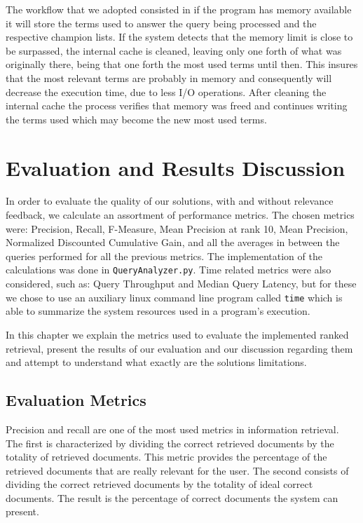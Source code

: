 \documentclass[12pt]{article}
\begin{document}
The workflow that we adopted consisted in if the program has memory available it will store the terms used to answer the query being processed and the respective champion lists. If the system detects that the memory limit is close to be surpassed, the internal cache is cleaned, leaving only one forth of what was originally there, being that one forth the most used terms until then. This insures that the most relevant terms are probably in memory and consequently will decrease the execution time, due to less I/O operations.  After cleaning the internal cache the process verifies that memory was freed and continues writing the terms used which may become the new most used terms.

\section{Evaluation and Results Discussion}

In order to evaluate the quality of our solutions, with and without relevance 
feedback, we calculate an assortment of performance metrics.
The chosen metrics were: Precision, Recall, F-Measure, Mean Precision at rank 10, 
Mean Precision, Normalized Discounted Cumulative Gain, and all the averages in 
between the queries performed for all the previous metrics.
The implementation of the calculations was done in \texttt{QueryAnalyzer.py}.
Time related metrics were also considered, such as: Query Throughput and Median 
Query Latency, but for these we chose to use an auxiliary linux command line 
program called \texttt{time} which is able to summarize the system resources 
used in a program's execution.

In this chapter we explain the metrics used to evaluate the implemented ranked
retrieval, present the results of our evaluation and our discussion regarding 
them and attempt to understand what exactly are the solutions limitations.

\subsection{Evaluation Metrics}

Precision and recall are one of the most used metrics in information retrieval.
The first is characterized by dividing the correct retrieved documents by the 
totality of retrieved documents. 
This metric provides the percentage of the retrieved documents that are really 
relevant for the user.
The second consists of dividing the correct retrieved documents by the totality 
of ideal correct documents. 
The result is the percentage of correct documents the system can present.
\end{document}
